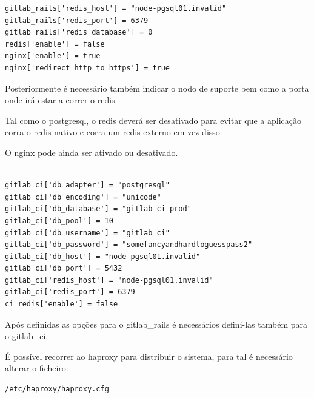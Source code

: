 \documentclass[12pt,a4paper]{article}
\begin{document}
\begin{verbatim}
gitlab_rails['redis_host'] = "node-pgsql01.invalid"  
gitlab_rails['redis_port'] = 6379  
gitlab_rails['redis_database'] = 0
redis['enable'] = false  
nginx['enable'] = true  
nginx['redirect_http_to_https'] = true  

\end{verbatim}

Posteriormente é necessário também indicar o nodo de suporte bem como a porta onde irá estar a correr o redis.

Tal como o postgresql, o redis deverá ser desativado para evitar que a aplicação corra o redis nativo e corra um redis externo em vez disso

O nginx pode ainda ser ativado ou desativado.

\begin{verbatim}

gitlab_ci['db_adapter'] = "postgresql"  
gitlab_ci['db_encoding'] = "unicode"  
gitlab_ci['db_database'] = "gitlab-ci-prod"  
gitlab_ci['db_pool'] = 10  
gitlab_ci['db_username'] = "gitlab_ci"  
gitlab_ci['db_password'] = "somefancyandhardtoguesspass2"  
gitlab_ci['db_host'] = "node-pgsql01.invalid"  
gitlab_ci['db_port'] = 5432  
gitlab_ci['redis_host'] = "node-pgsql01.invalid"  
gitlab_ci['redis_port'] = 6379  
ci_redis['enable'] = false 
\end{verbatim}

Após definidas as opções para o gitlab\_rails é necessários defini-las também para o gitlab\_ci.


É possível recorrer ao haproxy para distribuir o sistema, para tal é necessário alterar o ficheiro:
\begin{verbatim}
/etc/haproxy/haproxy.cfg
\end{verbatim}
\end{document}
